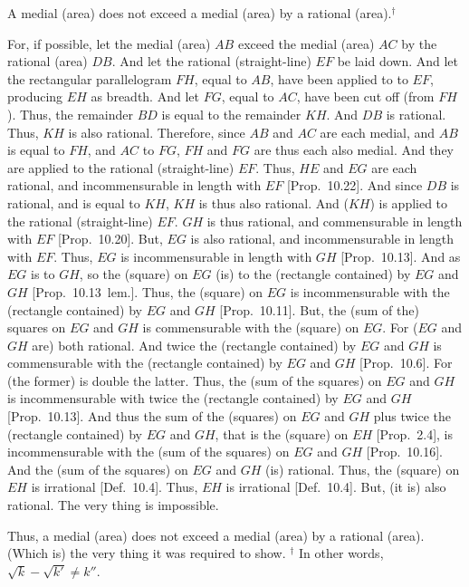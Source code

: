 A medial (area) does not exceed a medial
(area) by a rational (area).$^\dag$

\epsfysize=1.8in
\centerline{}

For, if possible, let the medial (area) $AB$ exceed the medial (area) $AC$
by the rational (area) $DB$. And let the rational (straight-line)
$EF$ be laid down. And let the rectangular parallelogram $FH$, equal to $AB$, have been
applied to to $EF$, producing $EH$ as breadth. And let $FG$, equal to
$AC$, have been cut off (from $FH$). Thus, the remainder $BD$
is equal to the remainder $KH$. And $DB$ is rational. Thus, $KH$
is also rational. Therefore, since $AB$ and $AC$ are each medial, and
$AB$ is equal to $FH$, and $AC$ to $FG$, $FH$ and $FG$ are thus each also medial. And they are applied to the rational (straight-line)
$EF$. Thus, $HE$ and $EG$ are each rational, and incommensurable
in length with $EF$ [Prop.~10.22]. 
And since $DB$ is rational, and is equal to $KH$, $KH$ is thus  also
rational. And ($KH$) is  applied to the rational (straight-line)
$EF$. $GH$ is thus rational, and commensurable in length with
$EF$ [Prop.~10.20]. But, $EG$ is also
rational, and incommensurable in length with $EF$. Thus, $EG$ is
incommensurable in length with $GH$ [Prop.~10.13]. And as $EG$ is to $GH$, so the
(square) on $EG$ (is) to the (rectangle contained) by $EG$ and
$GH$ [Prop.~10.13~lem.]. Thus, the (square)
on $EG$ is incommensurable with the (rectangle contained) by 
$EG$ and $GH$ [Prop.~10.11]. 
But, the (sum of the) squares on $EG$ and $GH$ is commensurable with
the (square) on $EG$. For ($EG$ and $GH$ are) both rational.
And twice the (rectangle contained) by $EG$ and $GH$ is commensurable
with the (rectangle contained) by $EG$ and $GH$ [Prop.~10.6]. For (the former) is double the latter.
Thus, the (sum of the squares) on $EG$ and $GH$ is incommensurable
with twice the (rectangle contained) by $EG$ and $GH$
[Prop.~10.13]. 
And thus the sum of the (squares) on $EG$ and $GH$ plus twice the (rectangle contained) by
$EG$ and $GH$, that is the (square) on $EH$ [Prop.~2.4], is incommensurable with the (sum
of the squares) on $EG$ and $GH$ [Prop.~10.16].
And the (sum of the squares) on $EG$ and $GH$ (is) rational. 
Thus, the (square) on $EH$ is irrational [Def.~10.4].
Thus, $EH$ is irrational  [Def.~10.4]. But,
(it is) also rational. The very thing is impossible.

Thus, a medial (area) does not exceed a medial
(area) by a rational (area). (Which is) the very thing it was required to show.
{\footnotesize\noindent$^\dag$ In other words, $\sqrt{k}-\sqrt{k'}\neq k''$.}

